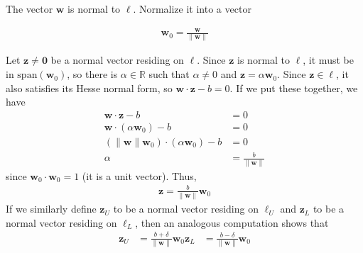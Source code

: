 \documentclass[12pt]{article}
\begin{document}
\begin{enumerate}
The vector $\mathbf{w}$ is normal to $\ell$. Normalize it into a vector

\begin{align*}
	\mathbf{w}_0=\frac{\mathbf{w}}{\|\mathbf{w}\|}
\end{align*}

Let $\mathbf{z}\neq \mathbf{0}$ be a normal vector residing on $\ell$. Since $\mathbf{z}$ is normal to
$\ell$, it must be in $\text{span}(\mathbf{w}_0)$, so there is $\alpha\in\mathbb{R}$
such that $\alpha\neq 0$ and $\mathbf{z}=\alpha \mathbf{w}_0$. Since $\mathbf{z}\in\ell$,
it also satisfies its Hesse normal form, so $\mathbf{w}\cdot\mathbf{z}-b=0$. If we put these
together, we have
\begin{align*}
	\mathbf{w}\cdot \mathbf{z}-b&=0\\
	\mathbf{w}\cdot (\alpha \mathbf{w}_0)-b&=0\\
	(\|\mathbf{w}\|\mathbf{w}_0)\cdot (\alpha \mathbf{w}_0)-b&=0\\
	\alpha &= \frac{b}{\|\mathbf{w}\|}
\end{align*}
since $\mathbf{w}_0\cdot \mathbf{w}_0=1$ (it is a unit vector). Thus,
\begin{align*}
	\mathbf{z}=\frac{b}{\|\mathbf{w}\|}\mathbf{w}_0
\end{align*}
If we similarly define $\mathbf{z}_U$ to be a normal vector residing on $\ell_U$
and $\mathbf{z}_L$ to be a normal vector residing on $\ell_L$, then
an analogous computation shows that
\begin{align*}
	\mathbf{z}_U&=\frac{b+\delta}{\|\mathbf{w}\|}\mathbf{w}_0
	\mathbf{z}_L&=\frac{b-\delta}{\|\mathbf{w}\|}\mathbf{w}_0
\end{align*}


\end{enumerate}
\end{document}
